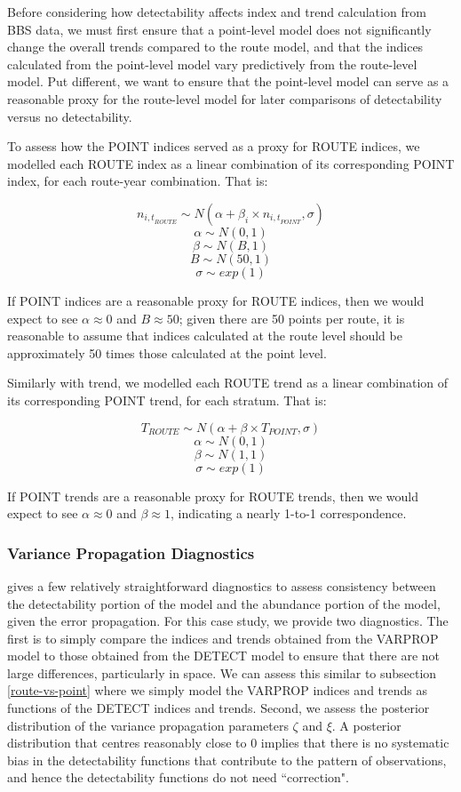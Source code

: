 \documentclass[12pt]{article}
\begin{document}
\par Before considering how detectability affects index and trend calculation from BBS data, we must first ensure that a point-level model does not significantly change the overall trends compared to the route model, and that the indices calculated from the point-level model vary predictively from the route-level model.
Put different, we want to ensure that the point-level model can serve as a reasonable proxy for the route-level model for later comparisons of detectability versus no detectability.

\par To assess how the POINT indices served as a proxy for ROUTE indices, we modelled each ROUTE index as a linear combination of its corresponding POINT index, for each route-year combination. 
That is:

$$	n_{{i,t}_{ROUTE}} \sim N(\alpha + \beta_i \times n_{{i,t}_{POINT}}, \sigma) $$
$$	\alpha \sim N(0,1) $$
$$	\beta \sim N(B, 1) $$
$$	B \sim N(50, 1) $$
$$	\sigma \sim exp(1)$$

If POINT indices are a reasonable proxy for ROUTE indices, then we would expect to see $\alpha \approx 0$ and $B \approx 50$; given there are 50 points per route, it is reasonable to assume that indices calculated at the route level should be approximately 50 times those calculated at the point level.

\par Similarly with trend, we modelled each ROUTE trend as a linear combination of its corresponding POINT trend, for each stratum.
That is:

$$ T_{ROUTE} \sim N(\alpha + \beta \times T_{POINT}, \sigma)$$
$$ \alpha \sim N(0,1) $$
$$ \beta \sim N(1,1) $$
$$ \sigma \sim exp(1) $$

If POINT trends are a reasonable proxy for ROUTE trends, then we would expect to see $\alpha \approx 0$ and $\beta \approx 1$, indicating a nearly 1-to-1 correspondence. 

\subsubsection{Variance Propagation Diagnostics}

\par \citet{bravington_variance_2021} gives a few relatively straightforward diagnostics to assess consistency between the detectability portion of the model and the abundance portion of the model, given the error propagation.
For this case study, we provide two diagnostics.
The first is to simply compare the indices and trends obtained from the VARPROP model to those obtained from the DETECT model to ensure that there are not large differences, particularly in space. 
We can assess this similar to subsection \ref{route-vs-point} where we simply model the VARPROP indices and trends as functions of the DETECT indices and trends.
Second, we assess the posterior distribution of the variance propagation parameters $\zeta$ and $\xi$.
A posterior distribution that centres reasonably close to 0 implies that there is no systematic bias in the detectability functions that contribute to the pattern of observations, and hence the detectability functions do not need ``correction".
\end{document}
